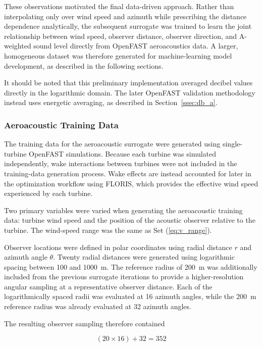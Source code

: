 \documentclass[11pt]{article}
\begin{document}
These observations motivated the final data-driven approach. Rather than interpolating only over wind speed and azimuth while prescribing the distance dependence analytically, the subsequent surrogate was trained to learn the joint relationship between wind speed, observer distance,
observer direction, and A-weighted sound level directly from OpenFAST aeroacoustics data. A larger, homogeneous dataset was therefore generated for machine-learning model development, as described in the following sections.

It should be noted that this preliminary implementation averaged decibel values directly in the logarithmic domain. The later OpenFAST validation methodology instead uses energetic averaging, as described in Section~\ref{ssec:db_a}.

\subsubsection{Aeroacoustic Training Data}

The training data for the aeroacoustic surrogate were generated using single-turbine OpenFAST simulations. Because each turbine was simulated independently, wake interactions between turbines were not included in the training-data generation process. Wake effects are instead accounted for later in the optimization workflow using FLORIS, which provides the effective wind speed experienced by each turbine.

Two primary variables were varied when generating the aeroacoustic training data: turbine wind speed and the position of the acoustic observer relative to the turbine. The wind-speed range was the same as Set (\ref{eq:v_range}).

Observer locations were defined in polar coordinates using radial distance $r$ and azimuth angle $\theta$. Twenty radial distances were generated using logarithmic spacing between 100 and 1000~m. The reference radius of 200~m was additionally included from the previous surrogate iterations to provide a higher-resolution angular sampling at a representative observer distance. Each of the logarithmically spaced radii was evaluated at 16 azimuth angles, while the 200~m reference radius was already evaluated at 32 azimuth angles.

The resulting observer sampling therefore contained

\begin{equation}
    (20 \times 16) + 32 = 352
\end{equation}
\end{document}
